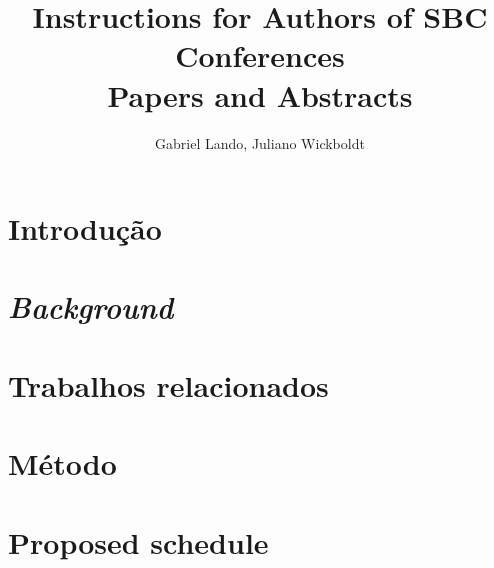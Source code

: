 \documentclass[12pt]{article}
\title{Instructions for Authors of SBC Conferences\\ Papers and Abstracts}
\author{Gabriel Lando\inst{1}, Juliano Wickboldt\inst{1}}
\begin{document}
 

\maketitle

\begin{abstract}

\end{abstract}
     
\begin{resumo} 

\end{resumo}

\section{Introdução}
\label{sec:intro}


\section{\textit{Background}}
\label{sec:background}


\section{Trabalhos relacionados}
\label{sec:related}


\section{Método}
\label{sec:method}


\section{Proposed schedule}
\label{sec:schedule}





\end{document}
